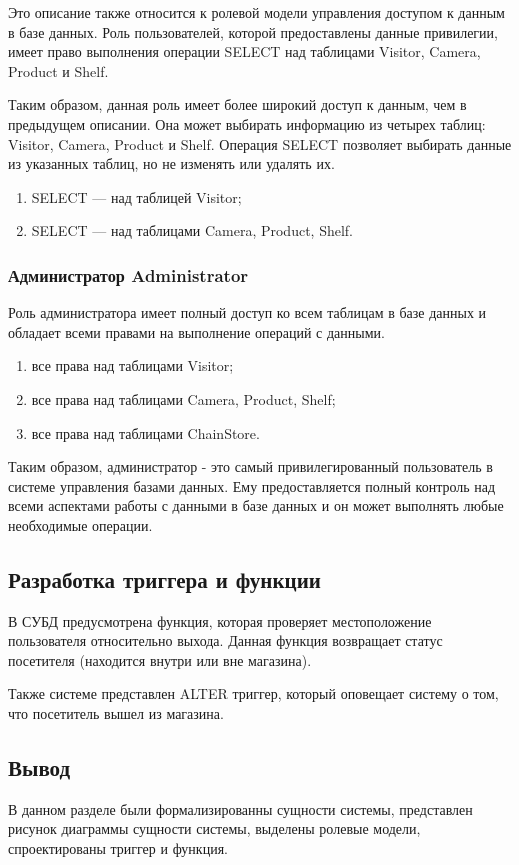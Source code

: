 Это описание также относится к ролевой модели управления доступом к данным в базе данных. Роль пользователей, которой предоставлены данные привилегии, имеет право выполнения операции SELECT над таблицами Visitor, Camera, Product и Shelf.

Таким образом, данная роль имеет более широкий доступ к данным, чем в предыдущем описании. Она может выбирать информацию из четырех таблиц: Visitor, Camera, Product и Shelf. Операция SELECT позволяет выбирать данные из указанных таблиц, но не изменять или удалять их.


\begin{enumerate}[label=\arabic*.]
    \item SELECT --- над таблицей Visitor;
    \item SELECT --- над таблицами Camera, Product, Shelf.
\end{enumerate}


\subsubsection{Администратор Administrator}

Роль администратора имеет полный доступ ко всем таблицам в базе данных и обладает всеми правами на выполнение операций с данными.

\begin{enumerate}[label=\arabic*.]
    \item все права над таблицами Visitor;
    \item все права над таблицами Camera, Product, Shelf;
    \item все права над таблицами ChainStore.
\end{enumerate}

Таким образом, администратор - это самый привилегированный пользователь в системе управления базами данных. Ему предоставляется полный контроль над всеми аспектами работы с данными в базе данных и он может выполнять любые необходимые операции.


\subsection{Разработка триггера и функции}

В СУБД предусмотрена функция, которая проверяет местоположение пользователя относительно выхода. 
Данная функция возвращает статус посетителя (находится внутри или вне магазина).

Также системе представлен ALTER триггер, который оповещает систему о том, 
что посетитель вышел из магазина.


\subsection*{Вывод}

В данном разделе были формализированны сущности системы, представлен рисунок диаграммы сущности системы,
выделены ролевые модели, спроектированы триггер и функция.